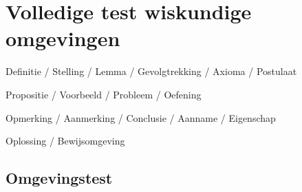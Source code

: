 \documentclass[nl]{../../elegantbook}
\begin{document}
\chapter{Volledige test wiskundige omgevingen}
\begin{introduction}
\item Definitie / Stelling / Lemma / Gevolgtrekking / Axioma / Postulaat
\item Propositie / Voorbeeld / Probleem / Oefening
\item Opmerking / Aanmerking / Conclusie / Aanname / Eigenschap
\item Oplossing / Bewijsomgeving
\end{introduction}

\section{Omgevingstest}
\end{document}
